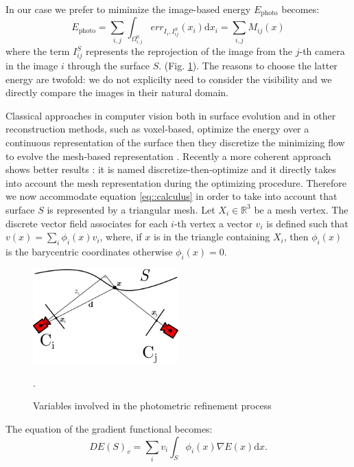 In our case we prefer to mimimize  \cite{pons2007multi} the image-based  energy $E_{\textrm{photo}}$ becomes:
\begin{equation}
\label{eq:energy_photo}
  E_{\textrm{photo}} = \sum_{i,j}\int_{\Omega^{\textrm{S}}_{i,j}} err_{I_i, I_{ij}^{\mathit{S}}}(x_i)\textrm{d}x_i = \sum_{i,j} \mathit{M}_{ij}(x)
\end{equation}
where the term $I_{ij}^{\mathit{S}}$ represents the reprojection of the image from the $j$-th camera in the image $i$ through the surface $\mathit{S}$.
(Fig. \ref{fig:cameraproj}).
The reasons to choose the latter energy are twofold: we do not explicilty need to consider the visibility and we directly compare the images in their natural domain.

Classical approaches in computer vision both in surface evolution and in other reconstruction methods, such as voxel-based, optimize the energy over a continuous representation of the surface then they discretize the minimizing flow to evolve the mesh-based representation \cite{pons2007multi,faugeras2002variational}. Recently a more coherent approach shows better results \cite{vu_et_al_2012,delaunoy_et_al_08}: it is named discretize-then-optimize and it directly takes into account the mesh representation during the optimizing procedure. 
Therefore we now accommodate equation \eqref{eq::calculus} in order to take into account that  surface $\mathit{S}$ is represented by a triangular mesh. 
Let $X_i \in \mathbb{R}^3$ be a mesh vertex. The discrete vector field associates for each $i$-th vertex a vector $v_i$ is defined such that $v(x) = \sum_i \phi_i(x) v_i$, where, if $x$ is in the triangle containing $X_i$, then $\phi_i(x)$ is the barycentric coordinates otherwise $\phi_i(x) = 0$.


\begin{figure}[t]
\centering
\includegraphics[width=0.5\textwidth]{./img/ch-incr-dens/cameproj}
\caption{Variables involved in the photometric refinement process}.
\label{fig:cameraproj}
\end{figure}

The equation of the gradient functional becomes:
\begin{equation}
  DE(\mathit{S})_v = \sum_i v_i \int_{\mathit{S}} \phi_i(x) \nabla E(x) \textrm{d}x.
\end{equation}

